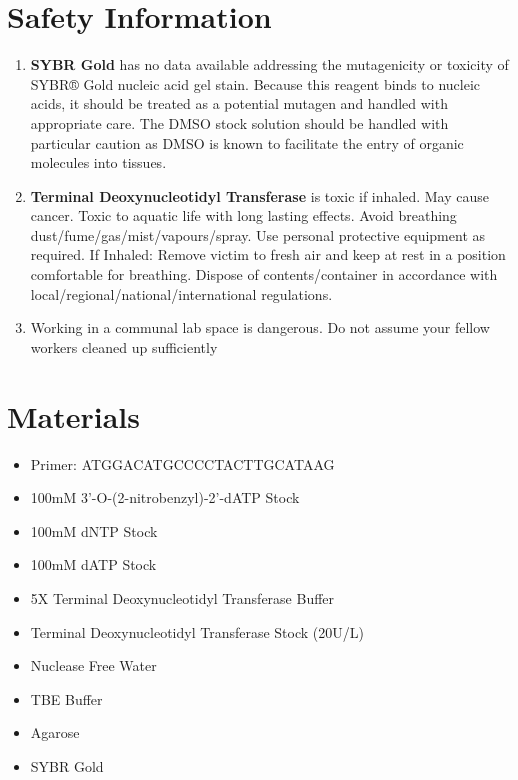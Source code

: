 \documentclass[letterpaper]{article}
\newenvironment{safety}{%
\begin{tcolorbox}[width=\textwidth, colframe=safetyFrame, arc=1.5mm]
}%
{\end{tcolorbox}}
\newcommand{\tdt}{Terminal Deoxynucleotidyl Transferase}
\newcommand{\uL}{\micro{}L}
\newcommand{\BdATP}{3'-O-(2-nitrobenzyl)-2'-dATP}
\newcommand{\B}[1]{\textbf{#1}}
\newcommand{\SYBRGOLD}{\item{\B{SYBR Gold} has no data available addressing the mutagenicity or toxicity of SYBR® Gold nucleic acid gel stain. Because this reagent binds to nucleic acids, it should be treated as a potential mutagen and handled with appropriate care. The DMSO stock solution should be handled with particular caution as DMSO is known to facilitate the entry of organic molecules into tissues.\cite{sybrGold}}}
\newcommand{\tdtSafety}{\item{\textbf{\tdt{}} is toxic if inhaled. May cause cancer. Toxic to aquatic life with long lasting effects. Avoid breathing dust/fume/gas/mist/vapours/spray. Use personal protective equipment as required. If Inhaled: Remove victim to fresh air and keep at rest in a position comfortable for breathing. Dispose of contents/container in accordance with local/regional/national/international regulations.\cite{Invitrogen2002}}}
\begin{document}
\section{Safety Information}
\begin{safety}
\begin{enumerate}
\SYBRGOLD{} %
\tdtSafety{}
\item{Working in a communal lab space is dangerous. Do not assume your fellow workers cleaned up sufficiently}
\end{enumerate}
\end{safety}

\section{Materials}
\begin{itemize}
\item{Primer: ATGGACATGCCCCTACTTGCATAAG}
\item{100mM \BdATP{} Stock}
\item{100mM dNTP Stock}
\item{100mM dATP Stock}
\item{5X \tdt{} Buffer}
\item{\tdt{} Stock (20U/\uL{})}
\item{Nuclease Free Water}
\item{TBE Buffer}
\item{Agarose}
\item{SYBR Gold}
\end{itemize}
\end{document}
